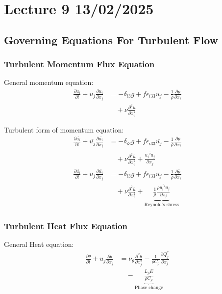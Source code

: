 \documentclass[fleqn,10pt]{SelfArx} %
\begin{document}
\clearpage

\section{Lecture 9 13/02/2025}
\subsection{Governing Equations For Turbulent Flow}
\subsubsection{Turbulent Momentum Flux Equation}
General momentum equation:
\begin{align*}
	\frac{\partial u_i}{\partial t} + u_j\frac{\partial u_i}{\partial x_j} &= -\delta_{i3}g + f\epsilon_{i33}u_j - \frac{1}{\rho}\frac{\partial p}{\partial x_i} \\ &\quad + \nu\frac{\partial^2 u}{\partial x_i^2}
\end{align*}

Turbulent form of momentum equation:
\begin{align*}
	\frac{\partial \overline{u_i}}{\partial t} + \overline{u_j}\frac{\partial \overline{u_i}}{\partial x_j} &= -\delta_{i3}g + f\epsilon_{i33}\overline{u_j} - \frac{1}{\rho}\frac{\partial \overline{p}}{\partial x_i} \\ &\quad + \nu\frac{\partial^2\overline{u}}{\partial x_i^2} + \frac{\overline{u_i'u_j}}{\partial x_j} \\
	\frac{\partial \overline{u_i}}{\partial t} + \overline{u_j}\frac{\partial \overline{u_i}}{\partial x_j} &= -\delta_{i3}g + f\epsilon_{i33}\overline{u_j} - \frac{1}{\rho}\frac{\partial \overline{p}}{\partial x_i} \\ &\quad + \nu\frac{\partial^2\overline{u}}{\partial x_i^2} + \underbrace{\frac{1}{\overline{\rho}}\frac{\overline{\rho u_i'u_j}}{\partial x_j}}_{\text{Reynold's shress}}
\end{align*}

\subsubsection{Turbulent Heat Flux Equation}
General Heat equation:
\begin{align*}
	\frac{\partial \theta}{\partial t} + u_j\frac{\partial \theta}{\partial x_j} &= \nu_{\theta}\frac{\partial^2 \theta}{\partial x^2_j} - \frac{1}{\rho C_p}\frac{\partial Q_j^*}{\partial x_j} \\ &\quad - \underbrace{\frac{L_p E}{\rho C_p}}_{\text{Phase change}}
\end{align*}
\end{document}
